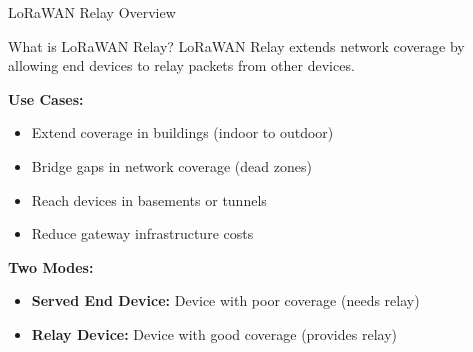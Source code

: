 \documentclass{beamer}
\begin{document}
\begin{frame}{LoRaWAN Relay Overview}
\begin{block}{What is LoRaWAN Relay?}
LoRaWAN Relay extends network coverage by allowing end devices to relay packets from other devices.
\end{block}

\vspace{0.3cm}

\textbf{Use Cases:}
\begin{itemize}
    \item Extend coverage in buildings (indoor to outdoor)
    \item Bridge gaps in network coverage (dead zones)
    \item Reach devices in basements or tunnels
    \item Reduce gateway infrastructure costs
\end{itemize}

\vspace{0.3cm}

\textbf{Two Modes:}
\begin{itemize}
    \item \textbf{Served End Device:} Device with poor coverage (needs relay)
    \item \textbf{Relay Device:} Device with good coverage (provides relay)
\end{itemize}
\end{frame}
\end{document}

